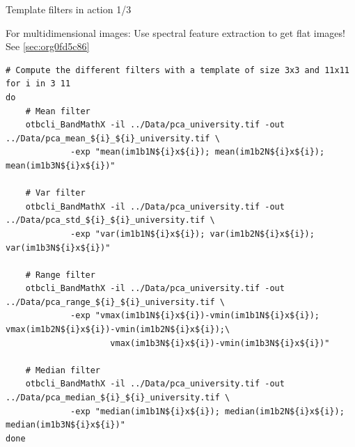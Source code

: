 \documentclass[10pt,aspectratio=1610]{beamer}
\begin{document}
\begin{frame}[fragile,label={sec:org8c42df5}]{Template filters in action 1/3}
 \begin{center}
\alert{For multidimensional images: Use spectral feature extraction to get flat images!} See \ref{sec:org0fd5c86}
\end{center}

\begin{verbatim}
# Compute the different filters with a template of size 3x3 and 11x11
for i in 3 11
do
    # Mean filter
    otbcli_BandMathX -il ../Data/pca_university.tif -out ../Data/pca_mean_${i}_${i}_university.tif \
		     -exp "mean(im1b1N${i}x${i}); mean(im1b2N${i}x${i}); mean(im1b3N${i}x${i})"

    # Var filter
    otbcli_BandMathX -il ../Data/pca_university.tif -out ../Data/pca_std_${i}_${i}_university.tif \
		     -exp "var(im1b1N${i}x${i}); var(im1b2N${i}x${i}); var(im1b3N${i}x${i})"

    # Range filter
    otbcli_BandMathX -il ../Data/pca_university.tif -out ../Data/pca_range_${i}_${i}_university.tif \
		     -exp "vmax(im1b1N${i}x${i})-vmin(im1b1N${i}x${i}); vmax(im1b2N${i}x${i})-vmin(im1b2N${i}x${i});\
                     vmax(im1b3N${i}x${i})-vmin(im1b3N${i}x${i})"

    # Median filter
    otbcli_BandMathX -il ../Data/pca_university.tif -out ../Data/pca_median_${i}_${i}_university.tif \
		     -exp "median(im1b1N${i}x${i}); median(im1b2N${i}x${i}); median(im1b3N${i}x${i})"
done
\end{verbatim}
\end{frame}
\end{document}
